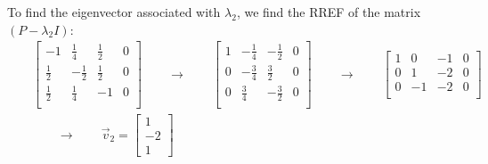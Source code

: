 To find the eigenvector associated with $\lambda_2$, we find the RREF of the matrix $(P-\lambda_2 I)$:
\begin{eqnarray*}
  &&\left[\begin{array}{ccc|c}
	-1&\frac{1}{4}&\frac{1}{2}&0\\\frac{1}{2}&-\frac{1}{2}&\frac{1}{2}&0\\\frac{1}{2}&\frac{1}{4}&-1&0\\
        \end{array}\right]\qquad\rightarrow\qquad
	\left[\begin{array}{ccc|c}
	1&-\frac{1}{4}&-\frac{1}{2}&0\\0&-\frac{3}{4}&\frac{3}{2}&0\\0&\frac{3}{4}&-\frac{3}{2}&0\\
        \end{array}\right]\qquad\rightarrow\qquad
	\left[\begin{array}{ccc|c}
	1&0&-1&0\\0&1&-2&0\\0&-1&-2&0\\
        \end{array}\right]\\
	&&\qquad\rightarrow\qquad\vec{v}_2=\left[\begin{array}{c}1\\-2\\1\end{array}\right]
\end{eqnarray*}

